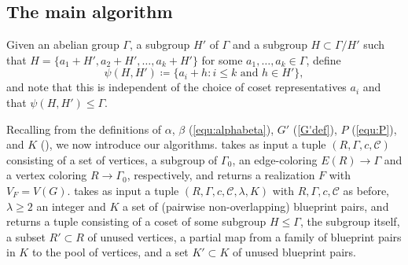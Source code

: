 \documentclass{article}
\newcommand{\cC}{\mathcal{C} }
\theoremstyle{definition}
\begin{document}
\subsection{The main algorithm}\label{sec:algo}

Given an abelian group $\Gamma$, a subgroup $H'$ of $\Gamma$ and a subgroup $H\subset \Gamma/H'$ such that $H=\{a_1+H',a_2+H',\ldots,a_k+H'\}$ for some $a_1,\ldots,a_k\in \Gamma$, define 
\[\psi(H,H')\coloneqq \{a_i+h:i\leq k\text{ and } h\in H'\},\]
and note that this is independent of the choice of coset representatives $a_i$ and that $\psi(H, H')\leqslant\Gamma$.
 


Recalling from  the definitions of $\alpha$, $\beta$ (\cref{equ:alphabeta}), $G'$ (\cref{G'def}), $P$ (\cref{equ:P}),  and $K$ (), we now introduce our algorithms.  takes as input a tuple $(R, \Gamma, c, \cC)$ consisting of a set of vertices, a subgroup of $\Gamma_0$, an edge-coloring $E(R)\to \Gamma$ and a vertex coloring $R\to \Gamma_0$, respectively, and returns a realization $F$ with $V_F=V(G)$.  takes as input a tuple $(R, \Gamma, c, \cC, \lambda, K)$ with $R, \Gamma, c, \cC$ as before, $\lambda\geq 2$ an integer and $K$ a set of (pairwise non-overlapping) blueprint pairs, and returns a tuple consisting of a coset of some subgroup $H\leqslant \Gamma$, the subgroup itself, a subset $R'\subset R$ of unused vertices, a partial map from a family of blueprint pairs in $K$ to the pool of vertices, and a set $K'\subset K$ of unused blueprint pairs.
\end{document}
